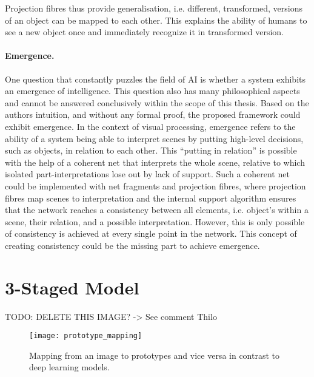Projection fibres thus provide generalisation, i.e. different, transformed, versions of an object can be mapped to each other. This explains the ability of humans to see a new object once and immediately recognize it in transformed version.

\paragraph{Emergence.} One question that constantly puzzles the field of AI is whether a system exhibits an emergence of intelligence.
This question also has many philosophical aspects and cannot be answered conclusively within the scope of this thesis.
Based on the authors intuition, and without any formal proof, the proposed framework could exhibit emergence.
In the context of visual processing, emergence refers to the ability of a system being able to interpret scenes by putting high-level decisions, such as objects, in relation to each other. This ``putting in relation'' is possible with the help of a coherent net that interprets the whole scene, relative to which isolated part-interpretations lose out by lack of support. Such a coherent net could be implemented with net fragments and projection fibres, where projection fibres map scenes to interpretation and the internal support algorithm ensures that the network reaches a consistency between all elements, i.e. object's within a scene, their relation, and a possible interpretation.
However, this is only possible of consistency is achieved at every single point in the network.
This concept of creating consistency could be the missing part to achieve emergence.








\section{3-Staged Model}

TODO: DELETE THIS IMAGE? -> See comment Thilo

\begin{figure}[h]
    \centering
    \texttt{[image: prototype\_mapping]}
    \caption[Mapping from an image to prototypes]{Mapping from an image to prototypes and vice versa in contrast to deep learning models.}
\end{figure}








